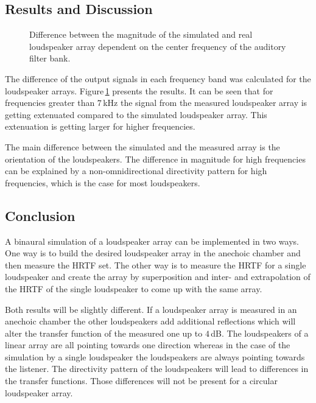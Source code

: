 \subsection{Results and Discussion}
%
\begin{figure}
    \small
    \centering
    
    \caption{Difference between the magnitude of the simulated and real
    loudspeaker array dependent on the center frequency of the auditory
    filter bank.
    }
    \label{fig:array_directivity}
\end{figure}
%
The difference of the output signals in each frequency band was calculated for
the loudspeaker arrays. Figure\,\ref{fig:array_directivity} presents the
results. It can be seen that for frequencies greater than $7$\,kHz the signal
from the measured loudspeaker array is getting extenuated compared to the
simulated loudspeaker array. This extenuation is getting larger for higher
frequencies.

The main difference between the
simulated and the measured array is the orientation of the loudspeakers.
The difference in magnitude for high frequencies can be explained by a
non-omnidirectional directivity pattern for high frequencies, which is the case
for most loudspeakers. 


\subsection{Conclusion}
%
A binaural simulation of a loudspeaker array can be implemented in two ways. One way is
to build the desired loudspeaker array in the anechoic chamber and then measure
the \ac{HRTF} set. The other way is to measure the \ac{HRTF} for a single loudspeaker and
create the array by superposition and inter- and extrapolation of the \ac{HRTF} of the single
loudspeaker to come up with the same array.

Both results will be slightly different. If a loudspeaker array is measured in
an anechoic chamber the other loudspeakers add additional reflections which will
alter the transfer function of the measured one up to
$4$\,dB.\autocite{Volk2010c} The loudspeakers of a linear array are all pointing
towards one direction whereas in the case of the simulation by a single
loudspeaker the loudspeakers are always pointing towards the listener. The directivity
pattern of the loudspeakers will lead to differences in the transfer
functions. Those differences will not be present for a circular loudspeaker array.


